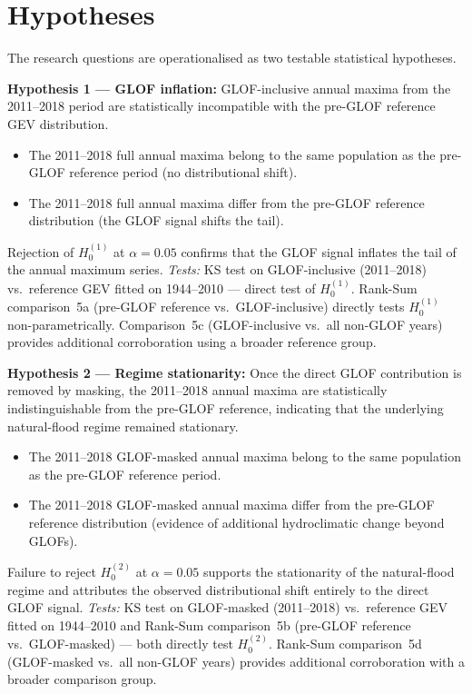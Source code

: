 \section{Hypotheses}
\label{sec:hyp}

The research questions are operationalised as two testable statistical hypotheses.

\textbf{Hypothesis 1 --- GLOF inflation:} GLOF-inclusive annual maxima from the 2011--2018 period
are statistically incompatible with the pre-GLOF reference GEV distribution.
\begin{itemize}
  \item[$H_0^{(1)}$:] The 2011--2018 full annual maxima belong to the same population as
        the pre-GLOF reference period (no distributional shift).
  \item[$H_1^{(1)}$:] The 2011--2018 full annual maxima differ from the pre-GLOF
        reference distribution (the GLOF signal shifts the tail).
\end{itemize}
Rejection of $H_0^{(1)}$ at $\alpha = 0.05$ confirms that the GLOF signal inflates the
tail of the annual maximum series.
\textit{Tests:} KS test on GLOF-inclusive (2011--2018) vs.\ reference GEV fitted
on 1944--2010 --- direct test of $H_0^{(1)}$. Rank-Sum comparison~5a (pre-GLOF
reference vs.\ GLOF-inclusive) directly tests $H_0^{(1)}$ non-parametrically.
Comparison~5c (GLOF-inclusive vs.\ all non-GLOF years) provides additional
corroboration using a broader reference group.

\textbf{Hypothesis 2 --- Regime stationarity:} Once the direct GLOF contribution is removed by
masking, the 2011--2018 annual maxima are statistically indistinguishable from the
pre-GLOF reference, indicating that the underlying natural-flood regime remained
stationary.
\begin{itemize}
  \item[$H_0^{(2)}$:] The 2011--2018 GLOF-masked annual maxima belong to the same
        population as the pre-GLOF reference period.
  \item[$H_1^{(2)}$:] The 2011--2018 GLOF-masked annual maxima differ from the pre-GLOF
        reference distribution (evidence of additional hydroclimatic change beyond GLOFs).
\end{itemize}
Failure to reject $H_0^{(2)}$ at $\alpha = 0.05$ supports the stationarity of the
natural-flood regime and attributes the observed distributional shift entirely to the
direct GLOF signal.
\textit{Tests:} KS test on GLOF-masked (2011--2018) vs.\ reference GEV fitted
on 1944--2010 and Rank-Sum comparison~5b (pre-GLOF reference vs.\ GLOF-masked) ---
both directly test $H_0^{(2)}$. Rank-Sum comparison~5d (GLOF-masked vs.\ all
non-GLOF years) provides additional corroboration with a broader comparison group.

